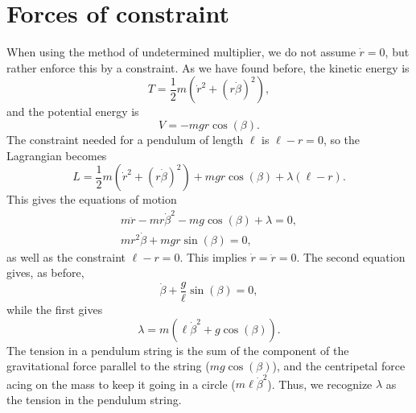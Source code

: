 \documentclass{article}
\begin{document}
    \section{Forces of constraint}
        When using the method of undetermined multiplier, we do not assume $\dot r = 0$, but rather enforce this by a constraint. As we have found before, the kinetic energy is 
        \begin{equation*}
            T = \frac{1}{2}m \left(\dot r^2 + (r \dot \beta)^2\right),
        \end{equation*}
        and the potential energy is 
        \begin{equation*}
            V = -mgr \cos(\beta).
        \end{equation*}
        The constraint needed for a pendulum of length $\ell$ is $\ell - r = 0$, so the Lagrangian becomes
        \begin{equation*}
            L = \frac{1}{2}m \left(\dot r^2 + (r \dot \beta)^2\right) + mgr \cos(\beta) + \lambda \left( \ell - r\right).
        \end{equation*}
        This gives the equations of motion
        \begin{align}
            m \ddot r - m r \dot \beta^2 - m g \cos(\beta) + \lambda = 0, \\
            m r^2 \dot \beta + mg r \sin(\beta) = 0,
        \end{align}
        as well as the constraint $\ell - r = 0$. This implies $\dot r = \ddot r = 0$. The second equation gives, as before,
        \begin{equation*}
            \dot \beta + \frac{g}{\ell} \sin(\beta) = 0,
        \end{equation*}
        while the first gives 
        \begin{equation*}
            \lambda = m(\ell \dot \beta^2 + g \cos(\beta)).
        \end{equation*}
        The tension in a pendulum string is the sum of the component of the gravitational force parallel to the string ($mg \cos(\beta)$), and the centripetal force acing on the mass to keep it going in a circle ($m \ell \dot \beta^2$). Thus, we recognize $\lambda$ as the tension in the pendulum string.
\end{document}
